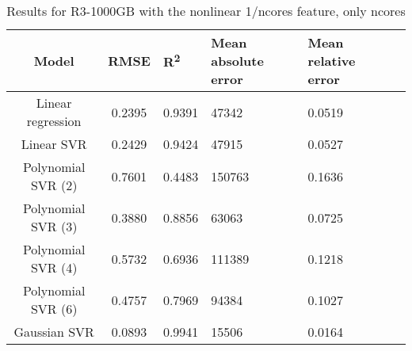 \begin{table}[H]
\centering
\begin{adjustbox}{center}
\begin{tabular}{c | c M{1.2cm} M{2.5cm} M{2.5cm} M{1.8cm}}
Model & RMSE & R\textsuperscript{2} & Mean absolute error & Mean relative error \tabularnewline
\hline
Linear regression & 0.2395 & 0.9391 &  47342 & 0.0519 \\
Linear SVR & 0.2429 & 0.9424 &  47915 & 0.0527 \\
Polynomial SVR (2) & 0.7601 & 0.4483 & 150763 & 0.1636 \\
Polynomial SVR (3) & 0.3880 & 0.8856 &  63063 & 0.0725 \\
Polynomial SVR (4) & 0.5732 & 0.6936 & 111389 & 0.1218 \\
Polynomial SVR (6) & 0.4757 & 0.7969 &  94384 & 0.1027 \\
Gaussian SVR & 0.0893 & 0.9941 &  15506 & 0.0164 \\
\end{tabular}
\end{adjustbox}
\\
\caption{Results for R3-1000GB with the nonlinear 1/ncores feature, only ncores}
\label{tab:all_nonlinear_R3_1000}
\end{table}
